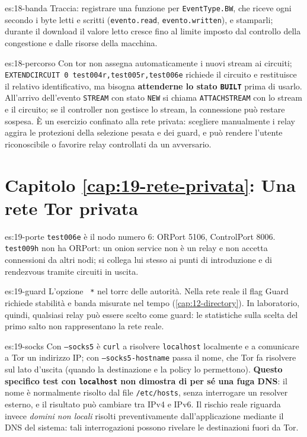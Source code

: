 \begin{soluzione}{es:18-banda}
Traccia: registrare una funzione per \texttt{EventType.BW}, che riceve ogni secondo i byte letti e scritti (\texttt{evento.read}, \texttt{evento.written}), e stamparli; durante il download il valore letto cresce fino al limite imposto dal controllo della congestione e dalle risorse della macchina.
\end{soluzione}

\begin{soluzione}{es:18-percorso}
Con  tor non assegna automaticamente i nuovi stream ai circuiti; \texttt{EXTENDCIRCUIT 0 test004r,test005r,test006e} richiede il circuito e restituisce il relativo identificativo, ma bisogna \textbf{attenderne lo stato \texttt{BUILT}} prima di usarlo. All'arrivo dell'evento \texttt{STREAM} con stato \texttt{NEW} si chiama \texttt{ATTACHSTREAM} con lo stream e il circuito; se il controller non gestisce lo stream, la connessione può restare sospesa. È un esercizio confinato alla rete privata: scegliere manualmente i relay aggira le protezioni della selezione pesata e dei guard, e può rendere l'utente riconoscibile o favorire relay controllati da un avversario.
\end{soluzione}

\section*{Capitolo \ref{cap:19-rete-privata}: Una rete Tor privata}

\begin{soluzione}{es:19-porte}
\texttt{test006e} è il nodo numero 6: ORPort 5106, ControlPort 8006. \texttt{test009h} non ha ORPort: un onion service non è un relay e non accetta connessioni da altri nodi; si collega lui stesso ai punti di introduzione e di rendezvous tramite circuiti in uscita.
\end{soluzione}

\begin{soluzione}{es:19-guard}
L'opzione ~\texttt{*} nel torrc delle autorità. Nella rete reale il flag Guard richiede stabilità e banda misurate nel tempo (\cref{cap:12-directory}). In laboratorio, quindi, qualsiasi relay può essere scelto come guard: le statistiche sulla scelta del primo salto non rappresentano la rete reale.
\end{soluzione}

\begin{soluzione}{es:19-socks}
Con \texttt{--socks5} è \texttt{curl} a risolvere \texttt{localhost} localmente e a comunicare a Tor un indirizzo IP; con \texttt{--socks5-hostname} passa il nome, che Tor fa risolvere sul lato d'uscita (quando la destinazione e la policy lo permettono). \textbf{Questo specifico test con \texttt{localhost} non dimostra di per sé una fuga DNS}: il nome è normalmente risolto dal file \texttt{/etc/hosts}, senza interrogare un resolver esterno, e il risultato può cambiare tra IPv4 e IPv6. Il rischio reale riguarda invece \emph{domini non locali} risolti preventivamente dall'applicazione mediante il DNS del sistema: tali interrogazioni possono rivelare le destinazioni fuori da Tor.
\end{soluzione}

